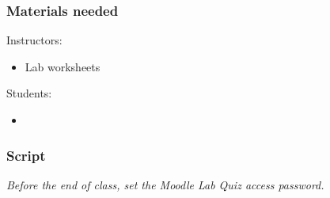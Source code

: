 \documentclass[12pt]{article}
\begin{document}
\subsubsection{Materials needed}

Instructors:
\begin{itemize}
\item Lab worksheets
\end{itemize}

\noindent
Students:
\begin{itemize}
\item 
\end{itemize}


\subsubsection{Script}


\emph{Before the end of class, set the Moodle Lab Quiz access password.}
\end{document}
